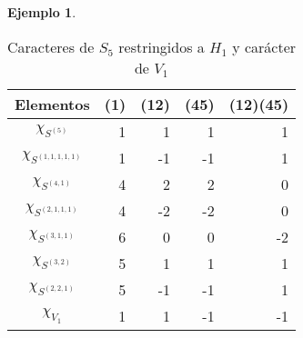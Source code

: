 \documentclass[12pt]{book}
\theoremstyle{definition}
\newtheorem{example}[theorem]{Ejemplo}
\newcounter{in}
\begin{document}
\begin{example}
\begin{table}[!hbtp]
  \centering
  \begin{tabular}{c |r r r r}
    Elementos & (1) & (12) & (45) & (12)(45) \\
    \hline
    $\chi_{S^{(5)}}$ & 1 & 1  & 1  & 1 \\
    $\chi_{S^{(1,1,1,1,1)}}$ & 1 & -1 & -1 & 1  \\
    $\chi_{S^{(4,1)}}$ & 4 & 2  & 2  & 0  \\
    $\chi_{S^{(2,1,1,1)}}$ & 4 & -2 & -2 & 0  \\
    $\chi_{S^{(3,1,1)}}$ & 6 & 0  & 0  & -2 \\
    $\chi_{S^{(3,2)}}$ & 5 & 1  & 1  & 1  \\
    $\chi_{S^{(2,2,1)}}$ & 5 & -1 & -1 & 1  \\
    \hline
    $\chi_{V_{1}}$ & 1 & 1 & -1 & -1 \\
  \end{tabular}

  \caption{Caracteres de $S_{5}$ restringidos a $H_{1}$ y carácter de $V_{1}$}
  \label{tab:clanes-H_1-5}
\end{table}


\end{example}
\end{document}
